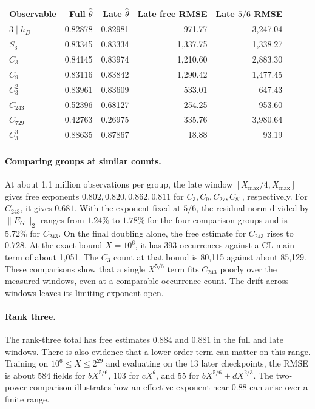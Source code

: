 \documentclass[11pt]{article}
\begin{document}
\begin{center}
\begin{tabular}{@{}lrrrr@{}}
\toprule
Observable & Full \(\widehat\theta\) & Late \(\widehat\theta\) &
Late free RMSE & Late \(5/6\) RMSE \\
\midrule
\(3\mid h_D\) & 0.82878 & 0.82981 & 971.77 & 3,247.04 \\
\(S_3\) & 0.83345 & 0.83334 & 1,337.75 & 1,338.27 \\
\(C_3\)                     & 0.84145 & 0.83974 & 1,210.60 & 2,883.30 \\
\(C_9\)                     & 0.83116 & 0.83842 & 1,290.42 & 1,477.45 \\
\(C_3^2\)                   & 0.83961 & 0.83609 & 533.01 & 647.43 \\
\(C_{243}\)                 & 0.52396 & 0.68127 & 254.25 & 953.60 \\
\(C_{729}\)                 & 0.42763 & 0.26975 & 335.76 & 3,980.64 \\
\(C_3^3\)                   & 0.88635 & 0.87867 & 18.88 & 93.19 \\
\bottomrule
\end{tabular}
\end{center}

\paragraph{Comparing groups at similar counts.}
At about 1.1 million observations per group, the late window
\([X_{\max}/4,X_{\max}]\) gives free exponents
\(0.802,0.820,0.862,0.811\) for \(C_3,C_9,C_{27},C_{81}\), respectively.
For \(C_{243}\), it gives \(0.681\). With the exponent fixed at \(5/6\),
the residual norm divided by \(\|E_G\|_2\) ranges from \(1.24\%\) to
\(1.78\%\) for the four comparison groups and is \(5.72\%\) for
\(C_{243}\). On the final doubling alone, the free estimate for \(C_{243}\)
rises to \(0.728\). At the exact bound \(X=10^6\), it has 393 occurrences
against a CL main term of about 1,051. The \(C_3\) count at that bound
is 80,115 against about 85,129. These comparisons show that a single
\(X^{5/6}\) term fits \(C_{243}\) poorly over the measured windows,
even at a comparable occurrence count. The drift across windows leaves
its limiting exponent open.

\paragraph{Rank three.}
The rank-three total has free estimates \(0.884\) and \(0.881\) in the
full and late windows. There is also evidence that a lower-order term can
matter on this range. Training on \(10^6\le X\le2^{29}\) and evaluating on
the 13 later checkpoints, the RMSE is about 584 fields for \(bX^{5/6}\),
103 for \(cX^\theta\), and 55 for \(bX^{5/6}+dX^{2/3}\). The two-power
comparison illustrates how an effective exponent near \(0.88\) can arise
over a finite range.
\end{document}
